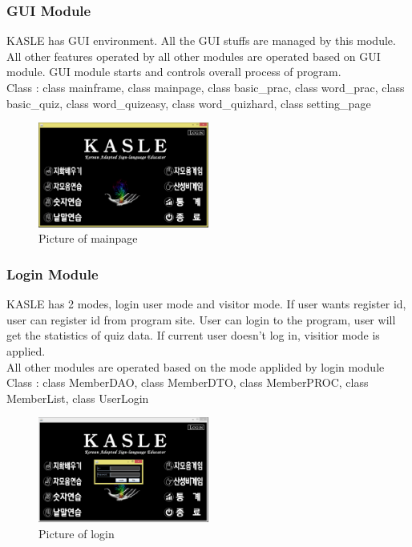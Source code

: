 \documentclass[10pt,journal,compsoc]{IEEEtran}
\begin{document}
\subsubsection{GUI Module\\}

KASLE has GUI environment. All the GUI stuffs are managed by this module. All other features operated by all other modules are operated based on GUI module. GUI module starts and controls overall process of program.
\\Class : class mainframe, class mainpage, class basic\_prac, class word\_prac, class basic\_quiz, class word\_quizeasy, class word\_quizhard, class setting\_page
\begin{figure}[H]
\centering
\includegraphics[width=0.5\textwidth]{mainpage.png}
{\caption*{Picture of mainpage}}
\end{figure}
\subsubsection{Login Module\\}

KASLE has 2 modes, login user mode and visitor mode. If user wants register id, user can register id from program site. User can login to the program, user will get the statistics of quiz data. If current user doesn't log in, visitior mode is applied.
\\All other modules are operated based on the mode applided by login module
\\Class : class MemberDAO, class MemberDTO, class MemberPROC, class MemberList, class UserLogin

\begin{figure}[H]
\centering
\includegraphics[width=0.5\textwidth]{cap_login.png}
{\caption*{Picture of login}}
\end{figure}
\end{document}
